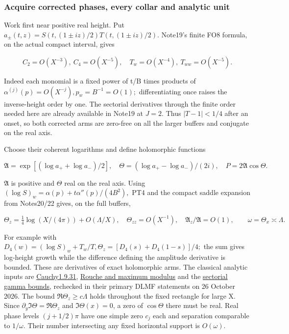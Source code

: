 \subsubsection{Acquire corrected phases, every collar and analytic unit}
\label{subsec:pt-2}

Work first near positive real height. Put $a_\pm(t,z)=S(t,(1\pm iz)/2)T(t,(1\pm iz)/2)$. Note19's finite FO8 formula, on the actual compact interval, gives

\[
C_2=O(X^{-3}),\ C_4=O(X^{-5}),\quad
T_w=O(X^{-4}),\ T_{ww}=O(X^{-5}).
\tag{PT4}\label{eq:ansatz-pt4}
\]

Indeed each monomial is a fixed power of t/B times products of \(\alpha^{(j)}(p)=O(X^{-j}), p_{w}=B^{-1}=O(1);\) differentiating once raises the inverse-height order by one. The sectorial derivatives through the finite order needed here are already available in Note19 at \(J=2.\) Thus \(|T-1|<1/4\) after an onset, so both corrected arms are zero-free on all the larger buffers and conjugate on the real axis.

Choose their coherent logarithms and define holomorphic functions

\[
\mathfrak A=\exp[(\log a_++\log a_-)/2],\quad
\Theta=(\log a_+-\log a_-)/(2i),\quad P=2\mathfrak A\cos\Theta.
\tag{PT5}\label{eq:ansatz-pt5}
\]

$\mathfrak A$ is positive and \(\Theta\) real on the real axis. Using \((\log S)_{w}=\alpha(p)+t \alpha''(p)/(4B^{2}),\) PT4 and the compact saddle expansion from Notes20/22 gives, on the full buffers,

\[
\Theta_z=\tfrac14\log(X/(4\pi))+O(\Lambda/X),\quad
\Theta_{zz}=O(X^{-1}),\quad
\mathfrak A_z/\mathfrak A=O(1),\qquad \omega=\Theta_x\asymp\Lambda.
\tag{PT6}\label{eq:ansatz-pt6}
\]

For example with \(D_{4}(w)=(\log S)_{w}+T_{w}/T, \Theta_{z}=[D_{4}(s)+D_{4}(1-s)]/4;\) the sum gives log-height growth while the difference defining the amplitude derivative is bounded. These are derivatives of exact holomorphic arms. The classical analytic inputs are \href{https://dlmf.nist.gov/1.9.E31}{Cauchy1.9.31}, \href{https://dlmf.nist.gov/1.10#iv}{Rouche and maximum modulus} and the \href{https://dlmf.nist.gov/5.11#ii}{sectorial gamma bounds}, rechecked in their primary DLMF statements on 26 October 2026. The bound $\Re\Theta_z\ge c\Lambda$ holds throughout the fixed rectangle for large X. Since \(\partial_{y} \Im\Theta=\Re\Theta_{z}\) and $\Im\Theta(x)=0$, a zero of $\cos\Theta$ there must be real. Real phase levels \((j+1/2)\pi\) have one simple zero \(c_{j}\) each and separation comparable to $1/\omega$. Their number intersecting any fixed horizontal support is \(O(\omega).\)

